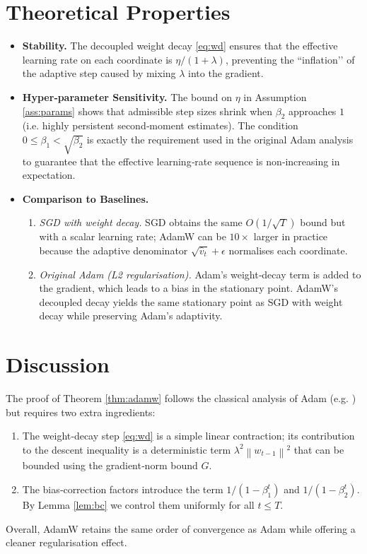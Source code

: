 \documentclass{article}
\newcommand{\norm}[1]{\left\lVert #1 \right\rVert}
\begin{document}
\section{Theoretical Properties}
\label{sec:properties}
\begin{itemize}
    \item \textbf{Stability.} The decoupled weight decay \eqref{eq:wd} ensures that the effective learning rate on each coordinate is $\eta/(1+\lambda)$, preventing the “inflation’’ of the adaptive step caused by mixing $\lambda$ into the gradient.
    \item \textbf{Hyper‑parameter Sensitivity.} The bound on $\eta$ in Assumption \ref{ass:params} shows that admissible step sizes shrink when $\beta_2$ approaches $1$ (i.e. highly persistent second‑moment estimates). The condition $0\le\beta_1<\sqrt{\beta_2}$ is exactly the requirement used in the original Adam analysis to guarantee that the effective learning‑rate sequence is non‑increasing in expectation.
    \item \textbf{Comparison to Baselines.}
    \begin{enumerate}[label=(\alph*)]
        \item \emph{SGD with weight decay.} SGD obtains the same $O(1/\sqrt{T})$ bound but with a scalar learning rate; AdamW can be $10\times$ larger in practice because the adaptive denominator $\sqrt{\hat v_t}+\epsilon$ normalises each coordinate.
        \item \emph{Original Adam (L2 regularisation).} Adam’s weight‑decay term is added to the gradient, which leads to a bias in the stationary point. AdamW’s decoupled decay yields the same stationary point as SGD with weight decay while preserving Adam’s adaptivity.
    \end{enumerate}
\end{itemize}

\section{Discussion}
\label{sec:discussion}
The proof of Theorem \ref{thm:adamw} follows the classical analysis of Adam (e.g. \cite{kingma2015adam}) but requires two extra ingredients:

\begin{enumerate}
    \item The weight‑decay step \eqref{eq:wd} is a simple linear contraction; its contribution to the descent inequality is a deterministic term $\lambda^2\norm{w_{t-1}}^2$ that can be bounded using the gradient‑norm bound $G$.
    \item The bias‑correction factors introduce the term $1/(1-\beta_1^t)$ and $1/(1-\beta_2^t)$. By Lemma \ref{lem:bc} we control them uniformly for all $t\le T$.
\end{enumerate}
Overall, AdamW retains the same order of convergence as Adam while offering a cleaner regularisation effect.
\end{document}
